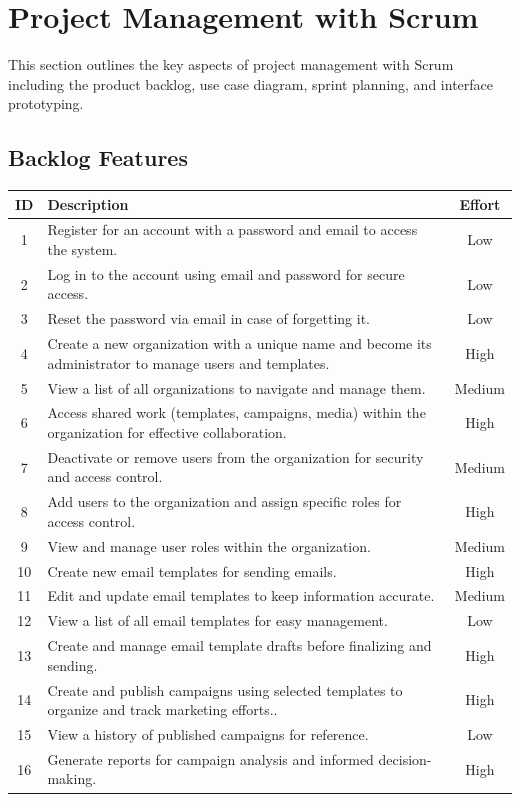 \section{Project Management with Scrum}

This section outlines the key aspects of project management with Scrum including the product backlog, use case diagram, sprint planning, and interface prototyping.

\subsection{Backlog Features}

\begin{longtable}{|c|p{}|c|}
	\hline
	\textbf{ID} & \textbf{Description} & \textbf{Effort} \\
	\hline
	1           & Register for an account with a password and email to access the system. & Low \\
	\hline
	2           & Log in to the account using email and password for secure access. & Low \\
	\hline
	3           & Reset the password via email in case of forgetting it. & Low \\
	\hline
	4           & Create a new organization with a unique name and become its administrator to manage users and templates. & High \\
	\hline
	5           & View a list of all organizations to navigate and manage them. & Medium \\
	\hline
	6           & Access shared work (templates, campaigns, media) within the organization for effective collaboration. & High \\
	\hline
	7           & Deactivate or remove users from the organization for security and access control. & Medium \\
	\hline
	8           & Add users to the organization and assign specific roles for access control. & High \\
	\hline
	9           & View and manage user roles within the organization. & Medium \\
	\hline
	10          & Create new email templates for sending emails. & High \\
	\hline
	11          & Edit and update email templates to keep information accurate. & Medium \\
	\hline
	12          & View a list of all email templates for easy management. & Low \\
	\hline
	13          & Create and manage email template drafts before finalizing and sending. & High \\
	\hline
	14          & Create and publish campaigns using selected templates to organize and track marketing efforts.. & High \\
	\hline
	15          & View a history of published campaigns for reference. & Low \\
	\hline
	16          & Generate reports for campaign analysis and informed decision-making. & High \\
	\hline
\end{longtable}

